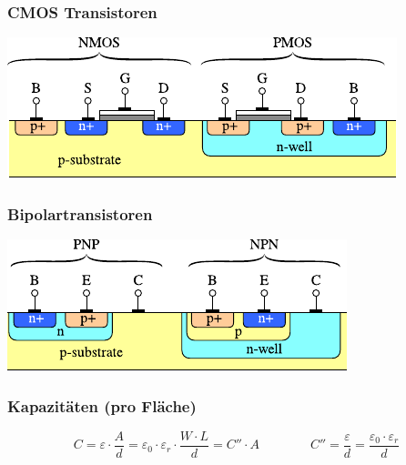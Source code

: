 \begin{minipage}[t]{0.48\columnwidth}
    \subsubsection{CMOS Transistoren}
    \includegraphics[width=\columnwidth, align=t]{images/01_CMOS.pdf}
\end{minipage}
\hfill
\begin{minipage}[t]{0.48\columnwidth}
    \subsubsection{Bipolartransistoren}
    \includegraphics[width=\columnwidth, align=t]{images/01_BJT.pdf}
\end{minipage}


\subsubsection{Kapazitäten (pro Fläche)}

\vspace{-0.3cm}

$$ \boxed{ C = \varepsilon \cdot  \frac{A}{d} = \varepsilon_0 \cdot \varepsilon_r \cdot \frac{W \cdot L}{d} =  C'' \cdot A } \qquad \qquad
    \boxed{ C'' = \frac{\varepsilon}{d} = \frac{\varepsilon_0 \cdot \varepsilon_r}{d} } $$

